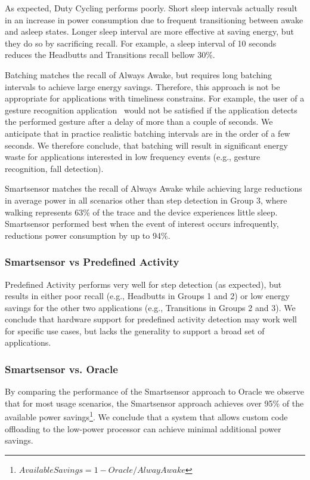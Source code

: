 As expected, Duty Cycling performs poorly.  Short sleep intervals
actually result in an increase in power consumption due to frequent
transitioning between awake and asleep states.  Longer sleep interval
are more effective at saving energy, but they do so by sacrificing
recall.  For example, a sleep interval of 10 seconds reduces the
Headbutts and Transitions recall bellow 30\%.

Batching matches the recall of Always Awake, but requires long
batching intervals to achieve large energy savings.  Therefore, this
approach is not be appropriate for applications with timeliness
constrains.  For example, the user of a gesture recognition
application~\cite{liu2009uwave,schlomer2008gesture} would not be
satisfied if the application detects the performed gesture after a
delay of more than a couple of seconds.  We anticipate that in
practice realistic batching intervals are in the order of a few
seconds.  We therefore conclude, that batching will result in
significant energy waste for applications interested in low frequency
events (e.g., gesture recognition, fall detection).

Smartsensor matches the recall of Always Awake while achieving large
reductions in average power in all scenarios other than step detection
in Group 3, where walking represents 63\% of the trace and the device
experiences little sleep.  Smartsensor performed best when the event
of interest occurs infrequently, reductions power consumption by up to
94\%.  

\subsubsection{Smartsensor vs Predefined Activity}

Predefined Activity performs very well for step detection (as
expected), but results in either poor recall (e.g., Headbutts in
Groups 1 and 2) or low energy savings for the other two applications
(e.g., Transitions in Groups 2 and 3).  We conclude that hardware
support for predefined activity detection may work well for specific
use cases, but lacks the generality to support a broad set of
applications.


\subsubsection{Smartsensor vs. Oracle}

By comparing the performance of the Smartsensor approach to Oracle we
observe that for most usage scenarios, the Smartsensor approach
achieves over 95\% of the available power
savings\footnote{$AvailableSavings=1-Oracle/AlwayAwake$}.
We conclude that a system that allows
custom code offloading to the low-power processor can achieve minimal
additional power savings.


